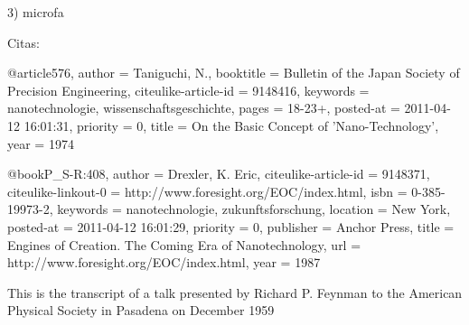 3) microfa

Citas:

@article{576,
    author = {Taniguchi, N.},
    booktitle = {Bulletin of the Japan Society of Precision Engineering},
    citeulike-article-id = {9148416},
    keywords = {nanotechnologie, wissenschaftsgeschichte},
    pages = {18-23+},
    posted-at = {2011-04-12 16:01:31},
    priority = {0},
    title = {{On the Basic Concept of 'Nano-Technology'}},
    year = {1974}
}

@book{P_S-R:408,
    author = {Drexler, K. Eric},
    citeulike-article-id = {9148371},
    citeulike-linkout-0 = {http://www.foresight.org/EOC/index.html},
    isbn = {0-385-19973-2},
    keywords = {nanotechnologie, zukunftsforschung},
    location = {New York},
    posted-at = {2011-04-12 16:01:29},
    priority = {0},
    publisher = {Anchor Press},
    title = {{Engines of Creation. The Coming Era of Nanotechnology}},
    url = {http://www.foresight.org/EOC/index.html},
    year = {1987}
}

This is the transcript of a talk presented by Richard P. Feynman to the American Physical Society
in Pasadena on December 1959
